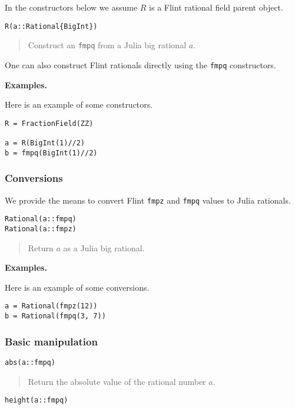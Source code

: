 \documentclass[a4paper,10pt]{article}
\newcommand{\code}{\lstinline}
\newcommand{\desc}[1]{\vspace{-3mm}\begin{quote}#1\end{quote}}
\begin{document}
{{In the constructors below we assume $R$ is a Flint rational field parent object.

\begin{lstlisting}
R(a::Rational{BigInt})
\end{lstlisting}

\desc{Construct an \code{fmpq} from a Julia big rational $a$.}

One can also construct Flint rationals directly using the \code{fmpq} constructors.

\textbf{Examples.}

Here is an example of some constructors.

\begin{lstlisting}
R = FractionField(ZZ)

a = R(BigInt(1)//2)
b = fmpq(BigInt(1)//2)
\end{lstlisting}

\subsubsection{Conversions}

We provide the means to convert Flint \code{fmpz} and \code{fmpq} values to Julia
rationals.

\begin{lstlisting}
Rational(a::fmpq)
Rational(a::fmpz)
\end{lstlisting}

\desc{Return $a$ as a Julia big rational.}

\textbf{Examples.}

Here is an example of some conversions.

\begin{lstlisting}
a = Rational(fmpz(12))
b = Rational(fmpq(3, 7))
\end{lstlisting}

\subsubsection{Basic manipulation}

\begin{lstlisting}
abs(a::fmpq)
\end{lstlisting}

\desc{Return the absolute value of the rational number $a$.}

\begin{lstlisting}
height(a::fmpq)
\end{lstlisting}

}}
\end{document}
